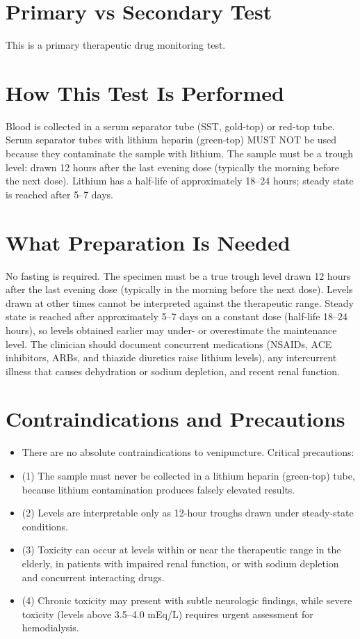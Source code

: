 \section*{Primary vs Secondary Test}
This is a primary therapeutic drug monitoring test.

\section*{How This Test Is Performed}
Blood is collected in a serum separator tube (SST, gold-top) or red-top tube. Serum separator tubes with lithium heparin (green-top) MUST NOT be used because they contaminate the sample with lithium. The sample must be a trough level: drawn 12 hours after the last evening dose (typically the morning before the next dose). Lithium has a half-life of approximately 18--24 hours; steady state is reached after 5--7 days.

\section*{What Preparation Is Needed}
No fasting is required. The specimen must be a true trough level drawn 12 hours after the last evening dose (typically in the morning before the next dose). Levels drawn at other times cannot be interpreted against the therapeutic range. Steady state is reached after approximately 5--7 days on a constant dose (half-life 18--24 hours), so levels obtained earlier may under- or overestimate the maintenance level. The clinician should document concurrent medications (NSAIDs, ACE inhibitors, ARBs, and thiazide diuretics raise lithium levels), any intercurrent illness that causes dehydration or sodium depletion, and recent renal function.

\section*{Contraindications and Precautions}
\begin{itemize}
  \item There are no absolute contraindications to venipuncture. Critical precautions:
  \item (1) The sample must never be collected in a lithium heparin (green-top) tube, because lithium contamination produces falsely elevated results.
  \item (2) Levels are interpretable only as 12-hour troughs drawn under steady-state conditions.
  \item (3) Toxicity can occur at levels within or near the therapeutic range in the elderly, in patients with impaired renal function, or with sodium depletion and concurrent interacting drugs.
  \item (4) Chronic toxicity may present with subtle neurologic findings, while severe toxicity (levels above 3.5--4.0 mEq/L) requires urgent assessment for hemodialysis.
\end{itemize}
